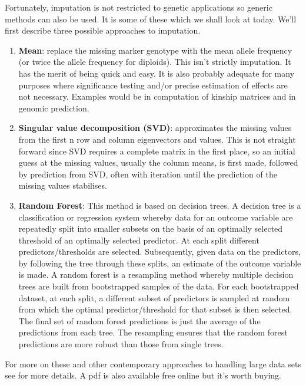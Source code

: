 \documentclass[
]{book}
\begin{document}
Fortunately, imputation is not restricted to genetic applications so generic methods can also be used. It is some of these which we shall look at today. We'll first describe three possible approaches to imputation.

\begin{enumerate}
\def\labelenumi{\arabic{enumi}.}
\item
  \textbf{Mean}: replace the missing marker genotype with the mean allele frequency (or twice the allele frequency for diploids). This isn't strictly imputation. It has the merit of being quick and easy. It is also probably adequate for many purposes where significance testing and/or precise estimation of effects are not necessary. Examples would be in computation of kinship matrices and in genomic prediction.
\item
  \textbf{Singular value decomposition (SVD)}: approximates the missing values from the first n row and column eigenvectors and values. This is not straight forward since SVD requires a complete matrix in the first place, so an initial guess at the missing values, usually the column means, is first made, followed by prediction from SVD, often with iteration until the prediction of the missing values stabilises.
\item
  \textbf{Random Forest}: This method is based on decision trees. A decision tree is a classification or regression system whereby data for an outcome variable are repeatedly split into smaller subsets on the basis of an optimally selected threshold of an optimally selected predictor. At each split different predictors/thresholds are selected. Subsequently, given data on the predictors, by following the tree through these splits, an estimate of the outcome variable is made. A random forest is a resampling method whereby multiple decision trees are built from bootstrapped samples of the data. For each bootstrapped dataset, at each split, a different subset of predictors is sampled at random from which the optimal predictor/threshold for that subset is then selected. The final set of random forest predictions is just the average of the predictions from each tree. The resampling ensures that the random forest predictions are more robust than those from single trees.
\end{enumerate}

For more on these and other contemporary approaches to handling large data sets see \citet{james_2013} for more details. A pdf is also available free online but it's worth buying.
\end{document}
